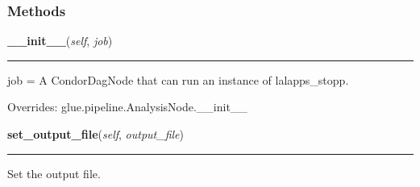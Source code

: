
  \subsubsection{Methods}

    \label{stochastic:StoppNode:__init__}
    \vspace{0.5ex}

    \begin{boxedminipage}{\textwidth}

    \raggedright \textbf{\_\_init\_\_}(\textit{self}, \textit{job})

    \vspace{-1.5ex}

    \rule{\textwidth}{0.5\fboxrule}
    job = A CondorDagNode that can run an instance of lalapps\_stopp.

    \vspace{1ex}

      Overrides: glue.pipeline.AnalysisNode.\_\_init\_\_

    \end{boxedminipage}

    \label{stochastic:StoppNode:set_output_file}
    \vspace{0.5ex}

    \begin{boxedminipage}{\textwidth}

    \raggedright \textbf{set\_output\_file}(\textit{self}, \textit{output\_file})

    \vspace{-1.5ex}

    \rule{\textwidth}{0.5\fboxrule}
    Set the output file.

    \vspace{1ex}

    \end{boxedminipage}


